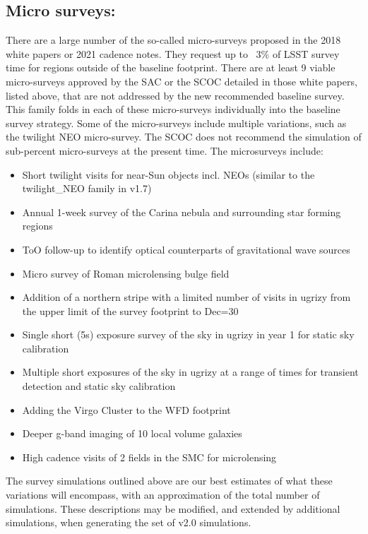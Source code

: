 \subsection{Micro surveys: }
There are a large number of the so-called micro-surveys proposed in the 2018 white papers or 2021 cadence notes. They request up to ~3\% of LSST survey time for regions outside of the baseline footprint. There are at least 9 viable micro-surveys approved by the SAC or the SCOC detailed in those white papers, listed above, that are not addressed by the new recommended baseline survey. This family folds in each of these micro-surveys individually into the baseline survey strategy.  Some of the micro-surveys include multiple variations, such as the twilight NEO micro-survey. The SCOC does not recommend the simulation of sub-percent micro-surveys at the present time. The microsurveys include:
\begin{itemize}
\item Short twilight visits for near-Sun objects incl. NEOs (similar to the twilight\_NEO family in v1.7)
\item Annual 1-week survey of the Carina nebula and surrounding star forming regions
\item ToO follow-up to identify optical counterparts of gravitational wave sources
\item Micro survey of Roman microlensing bulge field
\item Addition of a northern stripe with a limited number of visits in ugrizy from the upper limit of the survey footprint to Dec=30
\item Single short (5s) exposure survey of the sky in ugrizy in year 1 for static sky calibration %
\item Multiple short exposures of the sky in ugrizy at a range of times for transient detection and static sky calibration %
\item Adding the Virgo Cluster to the WFD footprint
\item Deeper g-band imaging of 10 local volume galaxies
\item High cadence visits of 2 fields in the SMC for microlensing
\end{itemize}

The survey simulations outlined above are our best estimates of what these variations will encompass, with an approximation of the total number of simulations. These descriptions may be modified, and extended by additional simulations, when generating the set of v2.0 simulations. 
 
